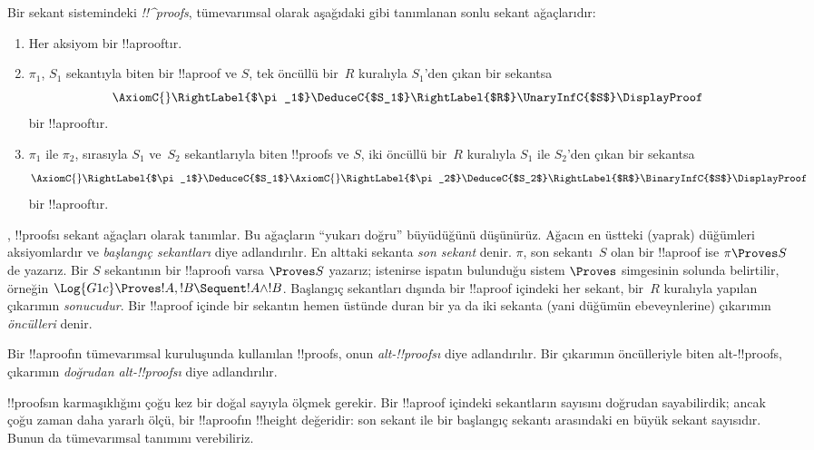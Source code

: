 \documentclass[../../../include/open-logic-section]{subfiles}
\begin{document}
\begin{defn}
Bir sekant sistemindeki \emph{!!^{proof}s}, tümevarımsal olarak aşağıdaki
gibi tanımlanan sonlu sekant ağaçlarıdır:
\begin{enumerate}
  \item{} Her aksiyom bir !!a{proof}{}tır.
  \item{} $\pi_1$, $S_1$ sekantıyla biten bir
  !!a{proof} ve $S$, tek öncüllü bir~$R$ kuralıyla $S_1$'den çıkan bir
  sekantsa
  \[
  \AxiomC{}
  \RightLabel{$\pi_1$}
  \DeduceC{$S_1$}
  \RightLabel{$R$}
  \UnaryInfC{$S$}
  \DisplayProof
  \]
  bir !!a{proof}{}tır.
  \item{} $\pi_1$ ile $\pi_2$, sırasıyla $S_1$
  ve~$S_2$ sekantlarıyla biten !!{proof}s ve $S$, iki öncüllü bir~$R$
  kuralıyla $S_1$ ile $S_2$'den çıkan bir sekantsa
  \[
  \AxiomC{}
  \RightLabel{$\pi_1$}
  \DeduceC{$S_1$}
  \AxiomC{}
  \RightLabel{$\pi_2$}
  \DeduceC{$S_2$}
  \RightLabel{$R$}
  \BinaryInfC{$S$}
  \DisplayProof
  \]
  bir !!a{proof}{}tır.
\end{enumerate}
\end{defn}

, !!{proof}s{}ı sekant ağaçları olarak tanımlar. Bu
ağaçların ``yukarı doğru'' büyüdüğünü düşünürüz. Ağacın en üstteki (yaprak)
düğümleri aksiyomlardır ve \emph{başlangıç sekantları} diye adlandırılır.
En alttaki sekanta \emph{son sekant} denir. $\pi$, son sekantı~$S$ olan bir
!!a{proof} ise $\pi \Proves S$ de yazarız. Bir $S$ sekantının bir
!!a{proof}{}ı varsa $\Proves S$ yazarız; istenirse ispatın bulunduğu
sistem $\Proves$ simgesinin solunda belirtilir, örneğin $\Log{G1c} \Proves
!A, !B \Sequent !A \land !B$. Başlangıç sekantları dışında bir !!a{proof}
içindeki her sekant, bir~$R$ kuralıyla yapılan çıkarımın \emph{sonucudur}.
Bir !!a{proof} içinde bir sekantın hemen üstünde duran bir ya da iki sekanta
(yani düğümün ebeveynlerine) çıkarımın \emph{öncülleri} denir.

Bir !!a{proof}{}ın tümevarımsal kuruluşunda kullanılan !!{proof}s, onun
\emph{alt-!!{proof}s{}ı} diye adlandırılır. Bir çıkarımın öncülleriyle biten
alt-!!{proof}s, çıkarımın \emph{doğrudan alt-!!{proof}s{}ı} diye adlandırılır.

!!{proof}s{}ın karmaşıklığını çoğu kez bir doğal sayıyla ölçmek gerekir.
Bir !!a{proof} içindeki sekantların sayısını doğrudan sayabilirdik; ancak
çoğu zaman daha yararlı ölçü, bir !!a{proof}{}ın !!{height} değeridir: son sekant
ile bir başlangıç sekantı arasındaki en büyük sekant sayısıdır. Bunun da
tümevarımsal tanımını verebiliriz.
\end{document}
